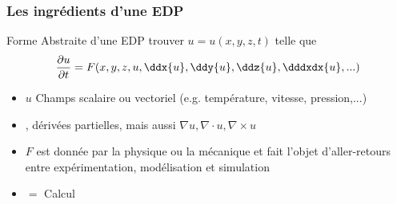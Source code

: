 \begin{frame}
  \frametitle{Les ingrédients d'une EDP}
  \begin{block}{Forme Abstraite d'une EDP}
    trouver $u = u(x,y,z,t)$ telle que
    \begin{equation}
      \label{eq:1}
      \frac{\partial u }{\partial t} = F( x, y, z, u, \ddx{u}, \ddy{u}, \ddz{u}, \dddxdx{u}, ... )
    \end{equation}
    \begin{itemize}
    \item $u$ Champs scalaire ou vectoriel (e.g. température, vitesse, pression,...)
    \item {},  dérivées partielles, mais aussi $\nabla u, \nabla \cdot u, \nabla \times u$
    \item $F$ est donnée par la physique ou la mécanique et fait l'objet
      d'\alert{aller-retours entre expérimentation, modélisation et
        simulation}
    \item $=$ Calcul
    \end{itemize}


  \end{block}
\end{frame}
